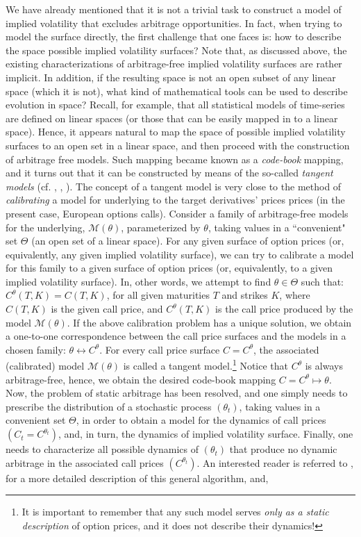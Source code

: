 \documentclass{article}
\numberwithin{equation}{section}
\begin{document}
We have already mentioned that it is not a trivial task to construct a model of implied volatility that excludes arbitrage opportunities. In fact, when trying to model the surface directly, the first challenge that one faces is: how to describe the space possible implied volatility surfaces? Note that, as discussed above, the existing characterizations of arbitrage-free implied volatility surfaces are rather implicit. In addition, if the resulting space is not an open subset of any linear space (which it is not), what kind of mathematical tools can be used to describe evolution in space? Recall, for example, that all statistical models of time-series are defined on linear spaces (or those that can be easily mapped in to a linear space). Hence, it appears natural to map the space of possible implied volatility surfaces to an open set in a linear space, and then proceed with the construction of arbitrage free models. Such mapping became known as a \emph{code-book} mapping, and it turns out that it can be constructed by means of the so-called \emph{tangent models} (cf. \cite{carmona2009localvol}, \cite{carmona2010tangentlevy}, \cite{carmona2011tangentlevy}). The concept of a tangent model is very close to the method of \emph{calibrating} a model for underlying to the target derivatives' prices prices (in the present case, European options calls). Consider a family of arbitrage-free models for the underlying, $\mathcal{M}(\theta)$, parameterized by $\theta$, taking values in a ``convenient" set $\Theta$ (an open set of a linear space). For any given surface of option prices (or, equivalently, any given implied volatility surface), we can try to calibrate a model for this family to a given surface of option prices (or, equivalently, to a given implied volatility surface). In, other words, we attempt to find $\theta\in\Theta$ such that: $C^{\theta}(T,K) = C(T,K)$, for all given maturities $T$ and strikes $K$, where $C(T,K)$ is the given call price, and $C^{\theta}(T,K)$ is the call price produced by the model $\mathcal{M}(\theta)$. If the above calibration problem has a unique solution, we obtain a one-to-one correspondence between the call price surfaces and the models in a chosen family: $\theta \leftrightarrow C^{\theta}$. For every call price surface $C=C^{\theta}$, the associated (calibrated) model $\mathcal{M}(\theta)$ is called a tangent model.\footnote{It is important to remember that any such model serves \emph{only as a static description} of option prices, and it does not describe their dynamics!} Notice that $C^{\theta}$ is always arbitrage-free, hence, we obtain the desired code-book mapping $C=C^{\theta}\mapsto \theta$. Now, the problem of static arbitrage has been resolved, and one simply needs to prescribe the distribution of a stochastic process $\left(\theta_t\right)$, taking values in a convenient set $\Theta$, in order to obtain a model for the dynamics of call prices $\left(C_t=C^{\theta_t}\right)$, and, in turn, the dynamics of implied volatility surface. Finally, one needs to characterize all possible dynamics of $\left(\theta_t\right)$ that produce no dynamic arbitrage in the associated call prices $\left(C^{\theta_t}\right)$. An interested reader is referred to \cite{carmona2011tangentlevy}, for a more detailed description of this general algorithm, and, 
\end{document}
